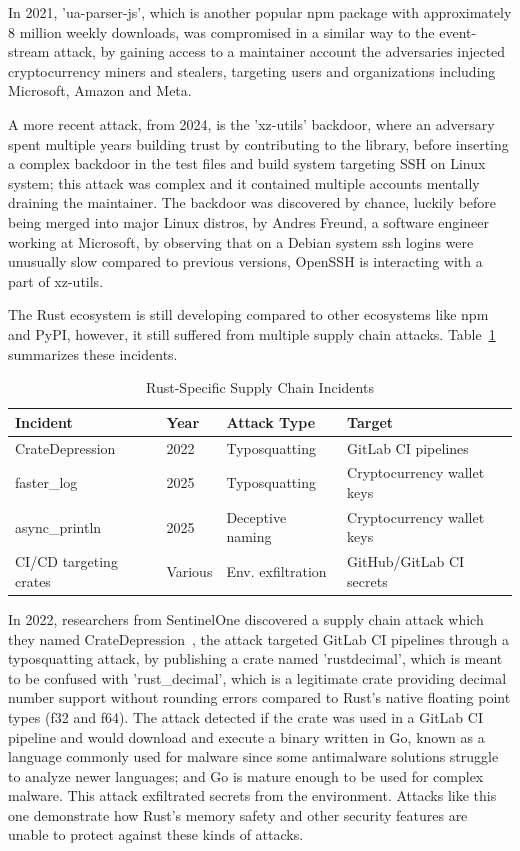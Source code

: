 In 2021, 'ua-parser-js', which is another popular npm package with approximately 8 million weekly downloads, was compromised in a similar way to the event-stream attack, by gaining access to a maintainer account the adversaries injected cryptocurrency miners and stealers, targeting users and organizations including Microsoft, Amazon and Meta.

A more recent attack, from 2024, is the 'xz-utils' backdoor, where an adversary spent multiple years building trust by contributing to the library, before inserting a complex backdoor in the test files and build system targeting SSH on Linux system; this attack was complex and it contained multiple accounts mentally draining the maintainer. The backdoor was discovered by chance, luckily before being merged into major Linux distros, by Andres Freund, a software engineer working at Microsoft, by observing that on a Debian system ssh logins were unusually slow compared to previous versions, OpenSSH is interacting with a part of xz-utils.

The Rust ecosystem is still developing compared to other ecosystems like npm and PyPI, however, it still suffered from multiple supply chain attacks. Table~\ref{tab:rust-incidents} summarizes these incidents.

\begin{table}[htbp]
\centering
\caption{Rust-Specific Supply Chain Incidents}
\label{tab:rust-incidents}
\begin{tabular}{|l|l|l|p{5.5cm}|}
\hline
\textbf{Incident} & \textbf{Year} & \textbf{Attack Type} & \textbf{Target} \\
\hline
CrateDepression & 2022 & Typosquatting & GitLab CI pipelines \\
\hline
faster\_log & 2025 & Typosquatting & Cryptocurrency wallet keys \\
\hline
async\_println & 2025 & Deceptive naming & Cryptocurrency wallet keys \\
\hline
CI/CD targeting crates & Various & Env. exfiltration & GitHub/GitLab CI secrets \\
\hline
\end{tabular}
\end{table}

In 2022, researchers from SentinelOne discovered a supply chain attack which they named CrateDepression~\cite{sentinelone2022cratedepression}, the attack targeted GitLab CI pipelines through a typosquatting attack, by publishing a crate named 'rustdecimal', which is meant to be confused with 'rust\_decimal', which is a legitimate crate providing decimal number support without rounding errors compared to Rust's native floating point types (f32 and f64). The attack detected if the crate was used in a GitLab CI pipeline and would download and execute a binary written in Go, known as a language commonly used for malware since some antimalware solutions struggle to analyze newer languages; and Go is mature enough to be used for complex malware. This attack exfiltrated secrets from the environment. Attacks like this one demonstrate how Rust's memory safety and other security features are unable to protect against these kinds of attacks.

